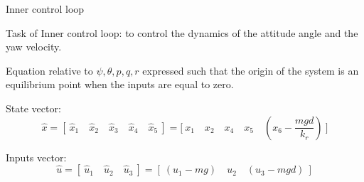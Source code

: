 \begin{frame}{Inner control loop}
	\begin{alertblock}{Task of Inner control loop: }
		\bigskip \hfill to control the dynamics of the attitude angle and the yaw velocity.
	\end{alertblock}
	\bigskip
	Equation relative to $ \psi, \theta, p, q, r $ expressed such that the origin of the system is an equilibrium point when the inputs are equal to zero.
	
	\begin{block}{State vector:}
		\begin{equation}
		\hat{x} = [ \ \hat{x}_1 \quad \hat{x}_2 \quad \hat{x}_3 \quad \hat{x}_4 \quad \hat{x}_5 \ ] = \Big[ \ x_1 \quad x_2 \quad x_4 \quad x_5 \quad (x_6-\dfrac{mgd}{k_r}) \ \Big]	
		\end{equation}
	\end{block}

	\begin{block}{Inputs vector:}
		\begin{equation}
		\hat{u} = [ \ \hat{u}_1 \quad \hat{u}_2 \quad \hat{u}_3 \ ] = [ \ (u_1 -mg) \quad u_2 \quad (u_3 - mgd) \ ]
		\end{equation}
	\end{block}
\end{frame}

